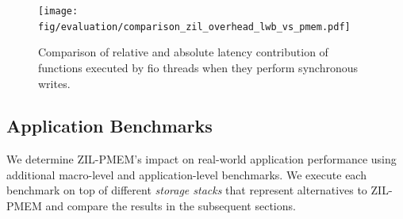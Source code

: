 \documentclass[12pt,a4paper,twoside]{book}
\begin{document}
{\begin{figure}[H]
    \centering
    \texttt{[image: fig/evaluation/comparison\_zil\_overhead\_lwb\_vs\_pmem.pdf]}
    \caption{
        Comparison of relative and absolute latency contribution of functions executed by fio threads when they perform synchronous writes.
    }
    \label{fig:eval:fio4k:breakdown}
\end{figure}

\subsection{Application Benchmarks}\label{sec:eval:appbenchmarks}
We determine ZIL-PMEM's impact on real-world application performance using additional macro-level and application-level benchmarks.
We execute each benchmark on top of different \textit{storage stacks} that represent alternatives to ZIL-PMEM and compare the results in the subsequent sections.

}
\end{document}
